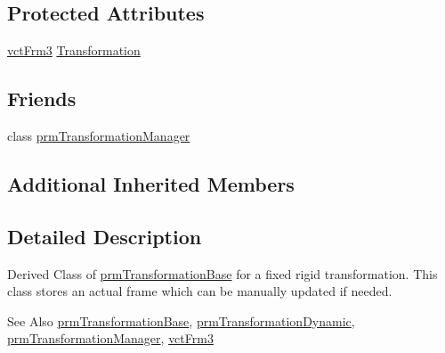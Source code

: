 \subsection*{Protected Attributes}
\begin{DoxyCompactItemize}
\item 
\hyperlink{vct_transformation_types_8h_a81feda0a02c2d1bc26e5553f409fed20}{vct\-Frm3} \hyperlink{classprm_transformation_fixed_a3b213d736a137afc62afc53ca79597b1}{Transformation}
\end{DoxyCompactItemize}
\subsection*{Friends}
\begin{DoxyCompactItemize}
\item 
class \hyperlink{classprm_transformation_fixed_af7fc0618e84bdf8b1d22bc2635f29eea}{prm\-Transformation\-Manager}
\end{DoxyCompactItemize}
\subsection*{Additional Inherited Members}


\subsection{Detailed Description}
Derived Class of \hyperlink{classprm_transformation_base}{prm\-Transformation\-Base} for a fixed rigid transformation. This class stores an actual frame which can be manually updated if needed.

\begin{DoxySeeAlso}{See Also}
\hyperlink{classprm_transformation_base}{prm\-Transformation\-Base}, \hyperlink{classprm_transformation_dynamic}{prm\-Transformation\-Dynamic}, \hyperlink{classprm_transformation_manager}{prm\-Transformation\-Manager}, \hyperlink{vct_transformation_types_8h_a81feda0a02c2d1bc26e5553f409fed20}{vct\-Frm3} 
\end{DoxySeeAlso}


